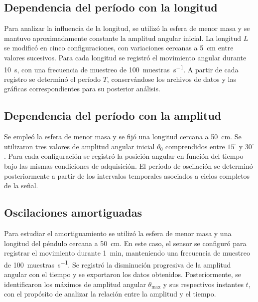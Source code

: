 \subsection{Dependencia del período con la longitud}

Para analizar la influencia de la longitud, se utilizó la esfera de menor masa y se mantuvo aproximadamente constante la amplitud angular inicial. La longitud $L$ se modificó en cinco configuraciones, con variaciones cercanas a \SI{5}{\centi\meter} entre valores sucesivos. Para cada longitud se registró el movimiento angular durante \SI{10}{\second}, con una frecuencia de muestreo de \SI{100}{muestras\per\second}. A partir de cada registro se determinó el período $T$, conservándose los archivos de datos y las gráficas correspondientes para su posterior análisis.

\subsection{Dependencia del período con la amplitud}

Se empleó la esfera de menor masa y se fijó una longitud cercana a \SI{50}{\centi\meter}. Se utilizaron tres valores de amplitud angular inicial $\theta_0$ comprendidos entre $15^\circ$ y $30^\circ$. Para cada configuración se registró la posición angular en función del tiempo bajo las mismas condiciones de adquisición. El período de oscilación se determinó posteriormente a partir de los intervalos temporales asociados a ciclos completos de la señal.

\subsection{Oscilaciones amortiguadas}

Para estudiar el amortiguamiento se utilizó la esfera de menor masa y una longitud del péndulo cercana a \SI{50}{\centi\meter}. En este caso, el sensor se configuró para registrar el movimiento durante \SI{1}{\minute}, manteniendo una frecuencia de muestreo de \SI{100}{muestras\per\second}. Se registró la disminución progresiva de la amplitud angular con el tiempo y se exportaron los datos obtenidos. Posteriormente, se identificaron los máximos de amplitud angular $\theta_{\max}$ y sus respectivos instantes $t$, con el propósito de analizar la relación entre la amplitud y el tiempo.
